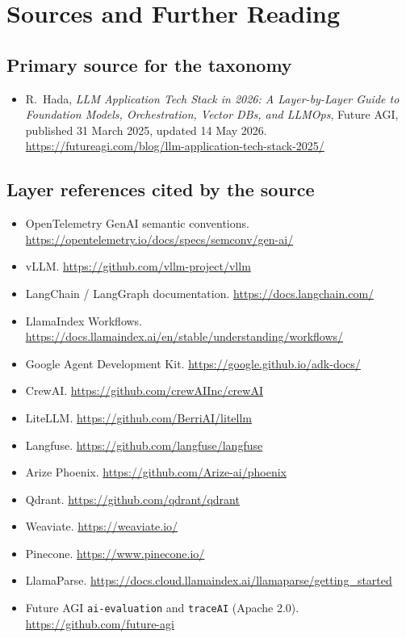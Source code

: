 \documentclass[11pt,twoside,openright]{book}
\theoremstyle{definition}
\theoremstyle{plain}
\theoremstyle{remark}
\newcommand{\code}[1]{\texttt{\small #1}}
\begin{document}
\chapter*{Sources and Further Reading}

\section*{Primary source for the taxonomy}

\begin{itemize}[leftmargin=1.4em]
  \item R.~Hada, \emph{LLM Application Tech Stack in 2026: A Layer-by-Layer Guide
        to Foundation Models, Orchestration, Vector DBs, and LLMOps}, Future AGI,
        published 31 March 2025, updated 14 May 2026.
        \url{https://futureagi.com/blog/llm-application-tech-stack-2025/}
\end{itemize}

\section*{Layer references cited by the source}

\begin{itemize}[leftmargin=1.4em,itemsep=1pt]
  \item OpenTelemetry GenAI semantic conventions. \url{https://opentelemetry.io/docs/specs/semconv/gen-ai/}
  \item vLLM. \url{https://github.com/vllm-project/vllm}
  \item LangChain / LangGraph documentation. \url{https://docs.langchain.com/}
  \item LlamaIndex Workflows. \url{https://docs.llamaindex.ai/en/stable/understanding/workflows/}
  \item Google Agent Development Kit. \url{https://google.github.io/adk-docs/}
  \item CrewAI. \url{https://github.com/crewAIInc/crewAI}
  \item LiteLLM. \url{https://github.com/BerriAI/litellm}
  \item Langfuse. \url{https://github.com/langfuse/langfuse}
  \item Arize Phoenix. \url{https://github.com/Arize-ai/phoenix}
  \item Qdrant. \url{https://github.com/qdrant/qdrant}
  \item Weaviate. \url{https://weaviate.io/}
  \item Pinecone. \url{https://www.pinecone.io/}
  \item LlamaParse. \url{https://docs.cloud.llamaindex.ai/llamaparse/getting_started}
  \item Future AGI \code{ai-evaluation} and \code{traceAI} (Apache 2.0).
        \url{https://github.com/future-agi}
\end{itemize}
\end{document}
